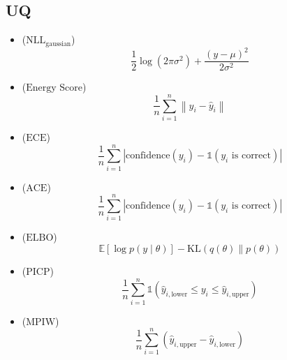 \begin{formelsammlung}
  \subsection*{UQ}
  \begin{mdframed}[style=exercise]
    \begin{itemize}[label={},left=0pt]
      \item {} (\( \text{NLL}_{\text{gaussian}} \)) 
      {\scriptsize \[
          \frac{1}{2} \log(2 \pi \sigma^2) + \frac{(y - \mu)^2}{2 \sigma^2}
      \]} \vspace{-1.5em}
      \item {} (\( \text{Energy Score} \)) 
      {\scriptsize \[
          \frac{1}{n} \sum_{i=1}^{n} \left\| y_i - \hat{y}_i \right\|
      \]} \vspace{-1.5em}
      \item {} (\( \text{ECE} \)) 
      {\scriptsize \[
          \frac{1}{n} \sum_{i=1}^{n} \left| \text{confidence}(y_i) - \mathbb{1}(y_i \text{ is correct}) \right|
      \]} \vspace{-1.5em}
      \item {} (\( \text{ACE} \)) 
      {\scriptsize \[
          \frac{1}{n} \sum_{i=1}^{n} \left| \text{confidence}(y_i) - \mathbb{1}(y_i \text{ is correct}) \right|
      \]} \vspace{-1.5em}
      \item {} (\( \text{ELBO} \)) 
      {\scriptsize \[
          \mathbb{E}[\log p(y \mid \theta)] - \text{KL}(q(\theta) \parallel p(\theta))
      \]} \vspace{-1.5em}
      \item {} (\( \text{PICP} \)) 
      {\scriptsize \[
          \frac{1}{n} \sum_{i=1}^{n} \mathbb{1}(\hat{y}_{i,\text{lower}} \leq y_i \leq \hat{y}_{i,\text{upper}})
      \]} \vspace{-1.5em}
      \item {} (\( \text{MPIW} \)) 
      {\scriptsize \[
          \frac{1}{n} \sum_{i=1}^{n} (\hat{y}_{i,\text{upper}} - \hat{y}_{i,\text{lower}})
      \]} \vspace{-1.5em}
    \end{itemize}
  \end{mdframed}

  \pagebreak


\end{formelsammlung}
